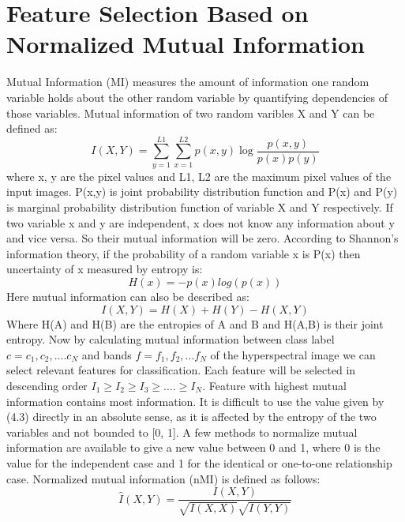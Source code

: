 \documentclass[document.tex]{subfiles}
\begin{document}
\section{Feature Selection Based on Normalized Mutual Information}
\noindent Mutual Information (MI) measures the amount of information one random variable holds about the other random variable\cite{20} by quantifying dependencies of those variables. Mutual information of two random varibles X and Y can be defined as:
\begin{equation}
I(X,Y) = \sum_{y=1}^{L1}\sum_{x=1}^{L2}p(x,y)\log\dfrac{p(x,y)}{p(x)p(y)}
\end{equation}
where x, y are the pixel values and L1, L2 are the maximum
pixel values of the input images. P(x,y) is joint probability distribution function and P(x) and P(y) is marginal probability distribution function of variable X and Y respectively. If two variable x and
y are independent, x does not know any information about y and vice versa. So their
mutual information will be zero. According to Shannon’s information theory, if the
probability of a random variable x is P(x) then uncertainty of x measured by entropy\cite{20} is:
\begin{equation}
H(x) = -p(x)log(p(x))
\end{equation}
Here mutual information can also be described as:
\begin{equation}
I(X,Y) = H(X) + H(Y) - H(X,Y)
\end{equation}
Where H(A) and H(B) are the entropies of A and B and H(A,B)
is their joint entropy. Now by calculating mutual information between class label $c = c_1,c_2,....c_N$ and bands $f = f_1,f_2,...f_N$ of the hyperspectral image we can select relevant features for classification. Each feature will be selected in descending order $I_1 \geq I_2 \geq I_3 \geq....\geq I_N$. Feature with highest mutual information contains most information. It is difficult to use the value given by (4.3) directly in an absolute sense, as it is affected by the entropy of the two variables and not bounded to [0, 1]. A few methods to normalize mutual information are available to give a new value between 0 and 1, where 0 is the value for the independent case and 1 for the identical or one-to-one relationship case. Normalized mutual information (nMI)\cite{21} is defined as follows:
\begin{equation}
\hat{I}(X,Y) = \dfrac{I(X,Y)}{\sqrt{I(X,X)}\sqrt{I(Y,Y)}}
\end{equation}
\end{document}
